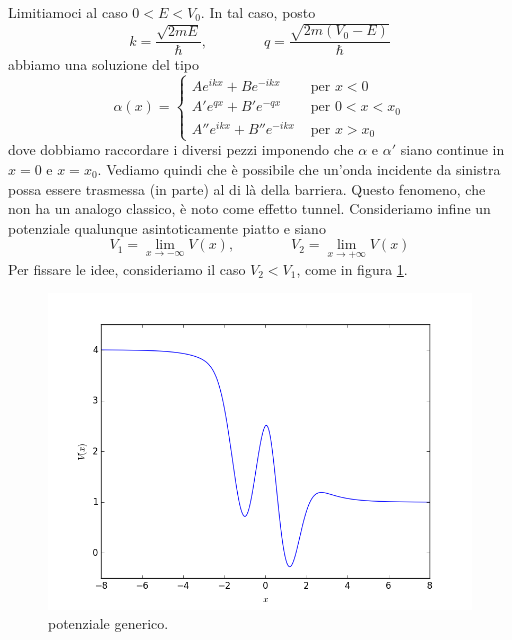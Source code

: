 \documentclass[a4paper, 11pt]{article}
\begin{document}
Limitiamoci al caso $0<E<V_0$. In tal caso, posto
\[k=\frac{\sqrt{2mE}}{\hbar},\qquad\qquad q=\frac{\sqrt{2m(V_0-E)}}{\hbar}\]
abbiamo una soluzione del tipo
\[\alpha(x)=\begin{cases}
Ae^{ikx}+Be^{-ikx}&\textrm{ per }x<0\\A'e^{qx}+B'e^{-qx}&\textrm{ per }0<x<x_0\\A''e^{ikx}+B''e^{-ikx}&\textrm{ per }x>x_0
\end{cases}\]
dove dobbiamo raccordare i diversi pezzi imponendo che $\alpha$ e $\alpha'$ siano continue in $x=0$ e $x=x_0$. Vediamo quindi che è possibile che un'onda incidente da sinistra possa essere trasmessa (in parte) al di là della barriera. Questo fenomeno, che non ha un analogo classico, è noto come effetto tunnel. Consideriamo infine un potenziale qualunque asintoticamente piatto e siano
\[V_1=\lim\limits_{x\to-\infty}V(x),\qquad\qquad V_2=\lim\limits_{x\to+\infty}V(x)\]
Per fissare le idee, consideriamo il caso $V_2<V_1$, come in figura \ref{fig:potential}.
\begin{figure}[h!]
	\centering
	\includegraphics[scale=0.7]{potential.png}
	\caption{potenziale generico.}
	\label{fig:potential}
\end{figure}
\end{document}
